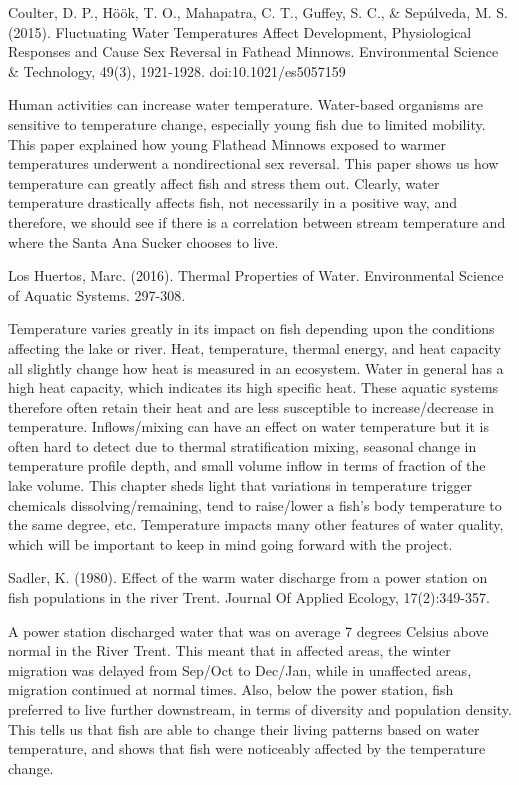 \documentclass{article}\usepackage[]{graphicx}\usepackage[]{color}
\begin{document}
Coulter, D. P., Höök, T. O., Mahapatra, C. T., Guffey, S. C., \& Sepúlveda, M. S. (2015). Fluctuating Water Temperatures Affect Development, Physiological Responses and Cause Sex Reversal in Fathead Minnows. Environmental Science \& Technology, 49(3), 1921-1928. doi:10.1021/es5057159

Human activities can increase water temperature. Water-based organisms are sensitive to temperature change, especially young fish due to limited mobility. This paper explained how young Flathead Minnows exposed to warmer temperatures underwent a nondirectional sex reversal. This paper shows us how temperature can greatly affect fish and stress them out. Clearly, water temperature drastically affects fish, not necessarily in a positive way, and therefore, we should see if there is a correlation between stream temperature and where the Santa Ana Sucker chooses to live.

Los Huertos, Marc. (2016). Thermal Properties of Water. Environmental Science of Aquatic Systems. 297-308.

Temperature varies greatly in its impact on fish depending upon the conditions affecting the lake or river. Heat, temperature, thermal energy, and heat capacity all slightly change how heat is measured in an ecosystem. Water in general has a high heat capacity, which indicates its high specific heat. These aquatic systems therefore often retain their heat and are less susceptible to increase/decrease in temperature. Inflows/mixing can have an effect on water temperature but it is often hard to detect due to thermal stratification mixing, seasonal change in temperature profile depth, and small volume inflow in terms of fraction of the lake volume. This chapter sheds light that variations in temperature trigger chemicals dissolving/remaining, tend to raise/lower a fish’s body temperature to the same degree, etc. Temperature impacts many other features of water quality, which will be important to keep in mind going forward with the project.

Sadler, K. (1980). Effect of the warm water discharge from a power station on fish populations in the river Trent. Journal Of Applied Ecology, 17(2):349-357.

A power station discharged water that was on average 7 degrees Celsius above normal in the River Trent. This meant that in affected areas, the winter migration was delayed from Sep/Oct to Dec/Jan, while in unaffected areas, migration continued at normal times. Also, below the power station, fish preferred to live further downstream, in terms of diversity and population density. This tells us that fish are able to change their living patterns based on water temperature, and shows that fish were noticeably affected by the temperature change. 
\end{document}

